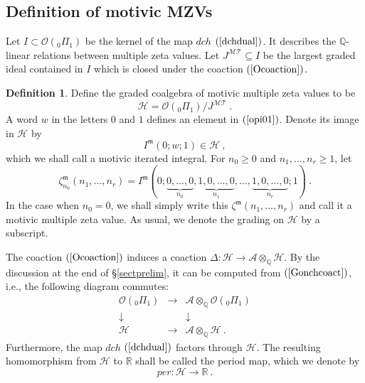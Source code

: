\documentclass[10pt]{amsart}
\theoremstyle{definition}
\newtheorem{defn}[thm]{Definition}
\theoremstyle{remark}
\numberwithin{equation}{section}
\newcommand{\R}{\mathbb R}
\newcommand{\Ho}{\mathcal{H}}
\newcommand{\MT}{\mathcal{MT}}
\newcommand{\Ao}{\mathcal{A}}
\newcommand{\pio}{{}_0 \Pi_{1}}
\newcommand{\dch}{dch}
\newcommand{\Jmt}{J^{\MT} }
\newcommand{\zetam}{\zeta^{ \mathfrak{m}}}
\newcommand{\Imot}{I^{\mathfrak{m}}}
\newcommand{\Q}{\mathbb Q}
\newcommand{\To}{\longrightarrow}
\begin{document}
\subsection{Definition of motivic MZVs} Let $I \subset \mathcal{O}(\pio)$ be the kernel of the map $\dch$ $(\ref{dchdual})$. It describes the $\Q$-linear relations between multiple zeta values. Let 
$\Jmt \subseteq I$ be the largest graded ideal contained in $I$ which is closed under the coaction $(\ref{Ocoaction})$. 
\begin{defn} Define the graded coalgebra of motivic multiple zeta values to be 
\begin{equation} \label{Hodef} \Ho = \mathcal{O}(\pio) / \Jmt \ .\end{equation}
A word $w$ in the letters $0$ and $1$ defines   an element in  $(\ref{opi01})$. Denote its image in $\Ho$ by
\begin{equation} \label{defnImot} \Imot(0;w;1) \in \Ho\ ,
\end{equation}
 which we shall call a motivic iterated integral.  
For $n_0\geq0 $ and $n_1,\ldots, n_r \geq 1$, let 
  \begin{equation} \label{zetamotdefn} 
  \zetam_{n_0}(n_1,\ldots, n_r) = \Imot(0; \underbrace{0,\ldots,0}_{n_0},\underbrace{1,0,\ldots,0}_{n_1}, \ldots,\underbrace{1,0,\ldots,0}_{n_r}  ;1) \ .
  \end{equation}
In the case when $n_0=0$, we shall  simply write this $\zetam(n_1,\ldots, n_r)$
and call it a motivic multiple zeta value. As usual, we denote the grading on $\Ho$ by a subscript.
 \end{defn}
The coaction  $(\ref{Ocoaction})$ induces a coaction  
$\Delta:\Ho \rightarrow \Ao \otimes_{\Q} \Ho $.  By the discussion at the end of \S\ref{sectprelim}, it can be computed from $(\ref{Gonchcoact})$, i.e., the following diagram commutes:
\begin{equation} \label{coprodistherightone}
 \begin{array}{ccc}
 \mathcal{O}(\pio) & \To    & \Ao \otimes_{\Q} \mathcal{O}(\pio)   \\
 \downarrow &   & \downarrow   \\
  \Ho & \To  & \Ao \otimes_{\Q} \Ho   \ .
\end{array}
\end{equation}
Furthermore, the map $\dch$ $(\ref{dchdual})$ factors through $\Ho$. The resulting homomorphism  from $\Ho$ to $\R$ shall be called  the period map, which we denote by
\begin{equation} \label{perdef} per: \Ho \To  \R\ . \end{equation}
\end{document}
